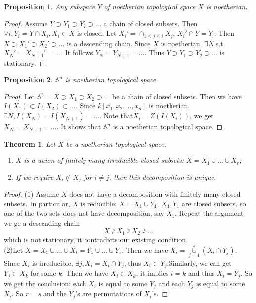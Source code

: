 \documentclass{amsart}
\theoremstyle{plain}
\newtheorem{theorem}{Theorem}
\newtheorem{proposition}{Proposition}
\theoremstyle{definition}
\theoremstyle{remark}
\numberwithin{equation}{section}
\begin{document}
 \begin{proposition}
 	Any subspace $ Y $ of noetherian topological space $ X $ is noetherian.
 \end{proposition}
 \begin{proof}
 	Assume $ Y\supset Y_1\supset Y_2\supset \dots $ a chain of closed subsets.
 	Then $ \forall i, Y_i=Y\cap X_i, X_i\subset X $ is closed.
 	Let $ X_{i}' = \cap_{1\leq j \leq i} X_j $, $ X_i'\cap Y = Y_i $. Then $ X\supset X_1'\supset X_2'\supset \dots $ is a descending chain. Since $ X $ is noetherian, $ \exists N $ s.t. $ X_N'=X_{N+1}'=\dots $. It follows $ Y_N=Y_{N+1}=\dots $. Thus $ Y\supset Y_1\supset Y_2\supset \dots $ is stationary.
 \end{proof}
 \begin{proposition}
 	$ \mathbb{A}^n $ is noetherian topological space.
 \end{proposition}
 \begin{proof}
 	Let $ \mathbb{A}^n=X\supset X_1\supset X_2\supset \dots $ be a chain of closed subsets. Then we have $ I(X_1)\subset I(X_2)\subset \dots $. Since $ k[x_1,x_2,\dots,x_n] $ is noetherian, $ \exists N, I(X_N)=I(X_{N+1})=\dots $. Note that$ X_i=Z(I(X_i)) $, we get $ X_N=X_{N+1}=\dots $. It shows that $ \mathbb{A}^n $ is a noetherian topological space.
 \end{proof}
 \begin{theorem}
 	Let $ X $ be a noetherian topological space.
 	\begin{enumerate}
 		\item $ X $ is a union of finitely many irreducible closed subsets: $X=X_1\cup\dots\cup X_r  $;
 		\item If we require $ X_i\not\subset X_j  $ for $ i\neq j $, then this decomposition is unique.
 	\end{enumerate}
 \end{theorem}
 \begin{proof}
 	(1) Assume $ X $ does not have a decomposition with finitely many closed subsets. In particular, $ X $ is reducible: $ X=X_1\cup Y_1 $, $ X_1,Y_1 $ are closed subsets. so one of the two sets does not have decomposition, say $ X_1 $. Repeat the argument we ge a descending chain
 	$$
 	X\supsetneqq X_1\supsetneqq X_2\supsetneqq \dots
 	$$
 	which is not stationary, it contradicts our existing condition.\\
 	(2)Let $ X=X_1\cup \dots\cup X_t = Y_1\cup\dots\cup Y_s$. Then we have $ X_i = \mathop{\cup}\limits_{j=1}^{s}(X_i\cap Y_j)$. Since $ X_i $ is irreducible, $ \exists j, X_i=X_i\cap Y_j $, thus $ X_i\subset Y_j $.Similarly, we can get $ Y_j\subset X_k $ for some $ k $. Then we have $ X_i\subset X_k $, it implies $ i=k $ and thus $ X_i = Y_j $. So we get the conclusion: each $ X_i $ is equal to some $ Y_j $ and each $ Y_j $ is equal to some $ X_i $. So $ r=s $ and the $ Y_j $'s are permutations of $ X_i $'s.
 \end{proof}
\end{document}
